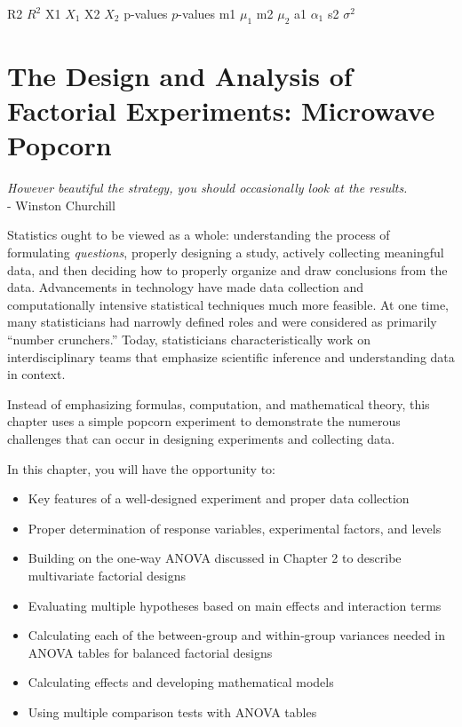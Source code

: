 \documentclass[
]{report}
\providecommand{\tightlist}{%
  \setlength{\itemsep}{0pt}\setlength{\parskip}{0pt}}
\begin{document}
R2 \(R^2\)
X1 \(X_1\)
X2 \(X_2\)
p-values \(p\)-values
m1 \(\mu_1\)
m2 \(\mu_2\)
a1 \(\alpha_1\)
s2 \(\sigma^2\)

\chapter{The Design and Analysis of Factorial Experiments: Microwave Popcorn}\label{the-design-and-analysis-of-factorial-experiments-microwave-popcorn}

{ \emph{However beautiful the strategy, you should occasionally look at the results.} }\\
{ - Winston Churchill}

Statistics ought to be viewed as a whole: understanding the process of formulating \emph{questions}, properly designing a study, actively collecting meaningful data, and then deciding how to properly organize and draw conclusions from the data. Advancements in technology have made data collection and computationally intensive statistical techniques much more feasible. At one time, many statisticians had narrowly defined roles and were considered as primarily ``number crunchers.'' Today, statisticians characteristically work on interdisciplinary teams that emphasize scientific inference and understanding data in context.

Instead of emphasizing formulas, computation, and mathematical theory, this chapter uses a simple popcorn experiment to demonstrate the numerous challenges that can occur in designing experiments and collecting data.

In this chapter, you will have the opportunity to:

\begin{itemize}
\tightlist
\item
  Key features of a well‑designed experiment and proper data collection\\
\item
  Proper determination of response variables, experimental factors, and levels\\
\item
  Building on the one‑way ANOVA discussed in Chapter 2 to describe multivariate factorial designs\\
\item
  Evaluating multiple hypotheses based on main effects and interaction terms\\
\item
  Calculating each of the between‑group and within‑group variances needed in ANOVA tables for balanced factorial designs\\
\item
  Calculating effects and developing mathematical models\\
\item
  Using multiple comparison tests with ANOVA tables
\end{itemize}
\end{document}

